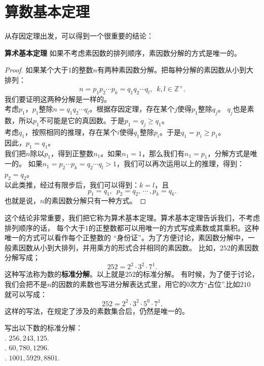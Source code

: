 \documentclass[12pt,UTF8]{ctexbook}
\begin{document}
\section{算数基本定理}
从存因定理出发，可以得到一个很重要的结论：
\begin{tm}{\textbf{算术基本定理}}\label{tm:1-1-0}
    如果不考虑素因数的排列顺序，素因数分解的方式是唯一的。
\end{tm}
\begin{proof}
    如果某个大于$1$的整数$n$有两种素因数分解。把每种分解的素因数从小到大排列：
    $$ n = p_1p_2\cdots p_k = q_1q_2\cdots q_l, \,\,\, k, l \in \mathbb{Z}^+.$$
    我们要证明这两种分解是一样的。\\
    考虑$p_1$，$p_1$整除$n = q_1q_2\cdots q_l$。根据存因定理，存在某个$j$使得$p_1$整除$q_j$。
    $q_j$也是素数，所以$p_1$不可能是它的真因数。于是$p_1 = q_j \geqslant q_1$。\\
    考虑$q_1$，按照相同的推理，存在某个$i$使得$q_1$整除$p_i$。于是$q_1 = p_i \geqslant p_1$。\\
    因此，$p_1 = q_1$。\\
    我们把$n$除以$p_1$，得到正整数$n_1$。如果$n_1 = 1$，那么我们有$n_1 = p_1$，分解方式是唯一的。
    如果$n_1 = p_2\cdots p_k = q_2\cdots q_l > 1$，我们可以再次运用以上的推理，得到：$p_2 = q_2$。\\
    以此类推，经过有限步后，我们可以得到：$k=l$，且
    $$p_1 = q_1, \,\,\, p_2 = q_2, \, \cdots \, , p_k = q_k.$$
    也就是说，$n$的素因数分解只有一种方式。
\end{proof}

这个结论非常重要，我们把它称为算术基本定理。算术基本定理告诉我们，不考虑排列顺序的话，
每个大于$1$的正整数都可以用唯一的方式写成素数或其乘积。这种唯一的方式可以看作每个正整数的
“身份证”。为了方便讨论，素因数分解中，一般素因数从小到大排列，并用乘方的形式合并相同的素因数。
比如，$252$的素因数分解写成；
$$ 252 = 2^2 \cdot 3^2 \cdot 7^1.$$
这种写法称为数的\textbf{标准分解}。以上就是$252$的标准分解。
有时候，为了便于讨论，我们会把不是$n$的因数的素数也写进分解表达式里，用它的$0$次方“占位”.比如$210$
就可以写成：
$$ 252 = 2^2 \cdot 3^2 \cdot 5^0 \cdot 7^1.$$
这样的写法，在规定了涉及的素数集合后，仍然是唯一的。

\begin{xt}\label{xt:1-1-0}
    写出以下数的标准分解：\\
    . $256, 243, 125$.\\
    . $60, 780, 1296$.\\
    . $1001, 5929, 8801$.
\end{xt}
\end{document}
